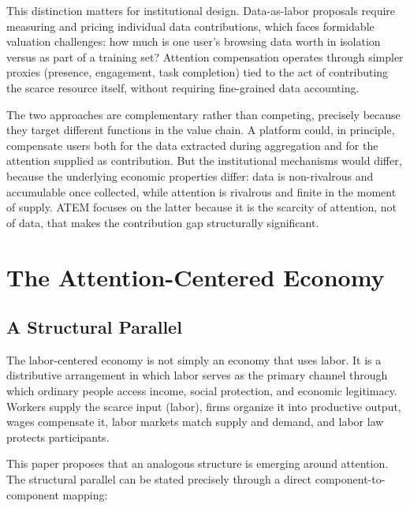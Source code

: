 \documentclass[12pt, a4paper]{article}
\begin{document}
This distinction matters for institutional design. Data-as-labor proposals require measuring and pricing individual data contributions, which faces formidable valuation challenges: how much is one user's browsing data worth in isolation versus as part of a training set? Attention compensation operates through simpler proxies (presence, engagement, task completion) tied to the act of contributing the scarce resource itself, without requiring fine-grained data accounting.

The two approaches are complementary rather than competing, precisely because they target different functions in the value chain. A platform could, in principle, compensate users both for the data extracted during aggregation and for the attention supplied as contribution. But the institutional mechanisms would differ, because the underlying economic properties differ: data is non-rivalrous and accumulable once collected, while attention is rivalrous and finite in the moment of supply. ATEM focuses on the latter because it is the scarcity of attention, not of data, that makes the contribution gap structurally significant.


\section{The Attention-Centered Economy}
\label{sec:ace}

\subsection{A Structural Parallel}
\label{sec:ace-parallel}

The labor-centered economy is not simply an economy that uses labor. It is a distributive arrangement in which labor serves as the primary channel through which ordinary people access income, social protection, and economic legitimacy. Workers supply the scarce input (labor), firms organize it into productive output, wages compensate it, labor markets match supply and demand, and labor law protects participants.

This paper proposes that an analogous structure is emerging around attention. The structural parallel can be stated precisely through a direct component-to-component mapping:
\end{document}
